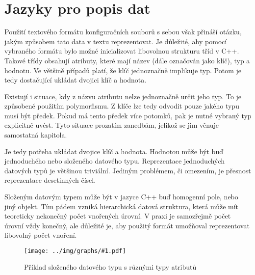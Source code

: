 \documentclass[FM,DP]{tulthesis}
\newcommand{\includeumlgraph}[2]{%
\begin{figure}
	\centering
    \texttt{[image: ../img/graphs/\#1.pdf]}
    \caption{#2}
	\label{uml:#1}
\end{figure}
}
\begin{document}

\section{Jazyky pro popis dat}

Použití textového formátu konfiguračních souborů s sebou však přináší otázku, jakým způsobem tato data v textu reprezentovat. Je důležité, aby pomocí vybraného formátu bylo možné inicializovat libovolnou strukturu tříd v C++. Takové třídy obsahují atributy, které mají název (dále označován jako klíč), typ a hodnotu. Ve většině případů platí, že klíč jednoznačně implikuje typ. Potom je tedy dostačující ukládat dvojici klíč a hodnota.

Existují i situace, kdy z názvu atributu nelze jednoznačně určit jeho typ. To je způsobené použitím polymorfismu. Z klíče lze tedy odvodit pouze jakého typu musí být předek. Pokud má tento předek více potomků, pak je nutné vybraný typ explicitně uvést. Tyto situace prozatím zanedbám, jelikož se jim věnuje samostatná kapitola.

Je tedy potřeba ukládat dvojice klíč a hodnota. Hodnotou může být buď jednoduchého nebo složeného datového typu. Reprezentace jednoduchých datových typů je většinou triviální. Jediným problémem, či omezením, je přesnost reprezentace desetinných čísel.

Složeným datovým typem může být v jazyce C++ buď homogenní pole, nebo jiný objekt. Tím pádem vzniká hierarchická datová struktura, která může mít teoreticky nekonečný počet vnořených úrovní. V praxi je samozřejmě počet úrovní vždy konečný, ale důležité je, aby použitý formát umožňoval reprezentovat libovolný počet vnoření.

\includeumlgraph{attribute_options}{Příklad složeného datového typu s různými typy atributů}
\end{document}
